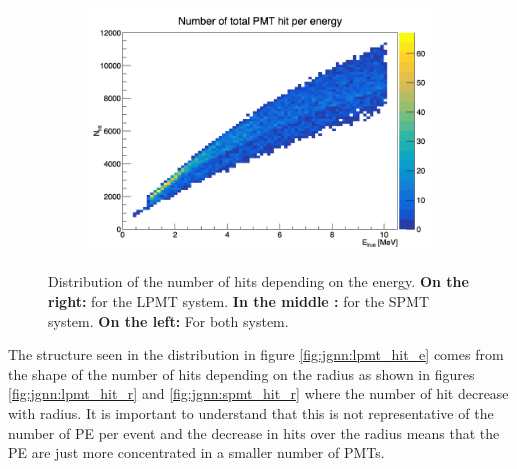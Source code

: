 \documentclass[../main.tex]{subfiles}
\begin{document}
\begin{figure}[ht]
\begin{subfigure}[t]{0.32\linewidth}
    \includegraphics[width=\linewidth]{images/jgnn/tot_hit_e.png}
    \caption{}
    \label{fig:jgnn:tot_hit_e}
  \end{subfigure}
  \caption{Distribution of the number of hits depending on the energy. \textbf{On the right:} for the LPMT system. \textbf{In the middle :} for the SPMT system. \textbf{On the left: } For both system.}
\end{figure}

The structure seen in the distribution in figure \ref{fig:jgnn:lpmt_hit_e} comes from the shape of the number of hits depending on the radius as shown in figures \ref{fig:jgnn:lpmt_hit_r} and \ref{fig:jgnn:spmt_hit_r} where the number of hit decrease with radius. It is important to understand that this is not representative of the number of PE per event and the decrease in hits over the radius means that the PE are just more concentrated in a smaller number of PMTs.
\end{document}
